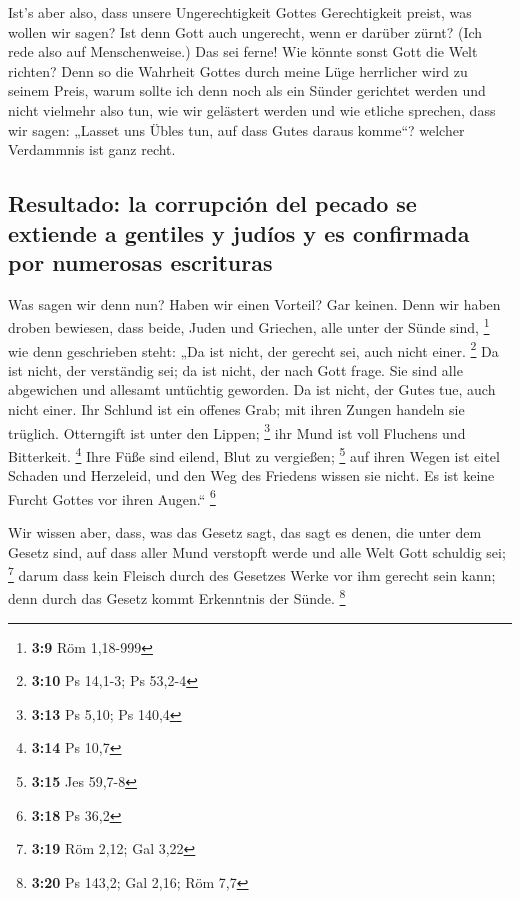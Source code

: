  Ist's aber also, dass unsere Ungerechtigkeit Gottes
Gerechtigkeit preist, was wollen wir sagen? Ist denn Gott auch
ungerecht, wenn er darüber zürnt? (Ich rede also auf Menschenweise.)
 Das sei ferne! Wie könnte sonst Gott die Welt richten?
 Denn so die Wahrheit Gottes durch meine Lüge herrlicher
wird zu seinem Preis, warum sollte ich denn noch als ein Sünder
gerichtet werden  und nicht vielmehr also tun, wie wir
gelästert werden und wie etliche sprechen, dass wir sagen: „Lasset uns
Übles tun, auf dass Gutes daraus komme``? welcher Verdammnis ist ganz
recht.

\hypertarget{resultado-la-corrupciuxf3n-del-pecado-se-extiende-a-gentiles-y-juduxedos-y-es-confirmada-por-numerosas-escrituras}{%
\subsection{Resultado: la corrupción del pecado se extiende a gentiles y
judíos y es confirmada por numerosas
escrituras}\label{resultado-la-corrupciuxf3n-del-pecado-se-extiende-a-gentiles-y-juduxedos-y-es-confirmada-por-numerosas-escrituras}}

 Was sagen wir denn nun? Haben wir einen Vorteil? Gar
keinen. Denn wir haben droben bewiesen, dass beide, Juden und Griechen,
alle unter der Sünde sind, \footnote{\textbf{3:9} Röm 1,18-999}
 wie denn geschrieben steht: „Da ist nicht, der gerecht
sei, auch nicht einer. \footnote{\textbf{3:10} Ps 14,1-3; Ps 53,2-4}
 Da ist nicht, der verständig sei; da ist nicht, der nach
Gott frage.  Sie sind alle abgewichen und allesamt
untüchtig geworden. Da ist nicht, der Gutes tue, auch nicht einer.
 Ihr Schlund ist ein offenes Grab; mit ihren Zungen
handeln sie trüglich. Otterngift ist unter den Lippen; \footnote{\textbf{3:13}
  Ps 5,10; Ps 140,4}  ihr Mund ist voll Fluchens und
Bitterkeit. \footnote{\textbf{3:14} Ps 10,7}  Ihre Füße
sind eilend, Blut zu vergießen; \footnote{\textbf{3:15} Jes 59,7-8}
 auf ihren Wegen ist eitel Schaden und Herzeleid,
 und den Weg des Friedens wissen sie nicht.
 Es ist keine Furcht Gottes vor ihren Augen.``
\footnote{\textbf{3:18} Ps 36,2}

 Wir wissen aber, dass, was das Gesetz sagt, das sagt es
denen, die unter dem Gesetz sind, auf dass aller Mund verstopft werde
und alle Welt Gott schuldig sei; \footnote{\textbf{3:19} Röm 2,12; Gal
  3,22}  darum dass kein Fleisch durch des Gesetzes Werke
vor ihm gerecht sein kann; denn durch das Gesetz kommt Erkenntnis der
Sünde. \footnote{\textbf{3:20} Ps 143,2; Gal 2,16; Röm 7,7}

